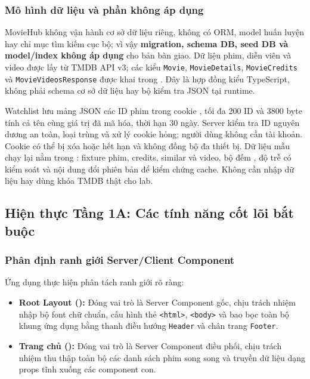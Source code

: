 \documentclass[12pt,a4paper]{extarticle}
\begin{document}
\subsubsection{Mô hình dữ liệu và phần không áp dụng}
\label{sec:data_setup}
MovieHub không vận hành cơ sở dữ liệu riêng, không có ORM, model huấn luyện hay chỉ mục tìm kiếm cục bộ; vì vậy \textbf{migration, schema DB, seed DB và model/index không áp dụng} cho bản bàn giao. Dữ liệu phim, diễn viên và video được lấy từ TMDB API v3; các kiểu \texttt{Movie}, \texttt{MovieDetails}, \texttt{MovieCredits} và \texttt{MovieVideosResponse} được khai trong . Đây là hợp đồng kiểu TypeScript, không phải schema cơ sở dữ liệu hay bộ kiểm tra JSON tại runtime.

Watchlist lưu mảng JSON các ID phim trong cookie , tối đa 200 ID và 3800 byte tính cả tên cùng giá trị đã mã hóa, thời hạn 30 ngày. Server kiểm tra ID nguyên dương an toàn, loại trùng và xử lý cookie hỏng; người dùng không cần tài khoản. Cookie có thể bị xóa hoặc hết hạn và không đồng bộ đa thiết bị. Dữ liệu mẫu chạy lại nằm trong : fixture phim, credits, similar và video, bộ đếm , độ trễ có kiểm soát và nội dung đổi phiên bản để kiểm chứng cache. Không cần nhập dữ liệu hay dùng khóa TMDB thật cho lab.

\subsection{Hiện thực Tầng 1A: Các tính năng cốt lõi bắt buộc}

\subsubsection{Phân định ranh giới Server/Client Component}
Ứng dụng thực hiện phân tách ranh giới rõ ràng:
\begin{itemize}[noitemsep]
    \item \textbf{Root Layout ():} Đóng vai trò là Server Component gốc, chịu trách nhiệm nhập bộ font chữ chuẩn, cấu hình thẻ \texttt{<html>}, \texttt{<body>} và bao bọc toàn bộ khung ứng dụng bằng thanh điều hướng \texttt{Header} và chân trang \texttt{Footer}.
    \item \textbf{Trang chủ ():} Đóng vai trò là Server Component điều phối, chịu trách nhiệm thu thập toàn bộ các danh sách phim song song và truyền dữ liệu dạng props tĩnh xuống các component con.
\end{itemize}
\end{document}
